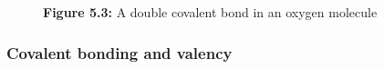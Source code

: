 {\begin{mdframed}[linewidth=4, leftmargin=40, rightmargin=40]
\begin{exercise}
\begin{enumerate}[noitemsep, label=\textbf{Step} \textbf{\arabic*}. ]
\begin{figure}[H]
\begin{center}
      \vspace{2pt}
    \vspace{\rubberspace}\par \begin{cnxcaption}
	  \small \textbf{Figure 5.3: }A double covalent bond in an oxygen molecule
	\end{cnxcaption}
      
    \vspace{.1in}
    
    \end{center}

 \end{figure}   

    \addtocounter{footnote}{-0}
    
        
        \end{enumerate}
         

    \end{exercise}
    \end{mdframed}
    }
    \noindent
  

\label{m38704*secfhsst!!!underscore!!!id172}
            \subsubsection{  Covalent bonding and valency
        }
            \nopagebreak
            
